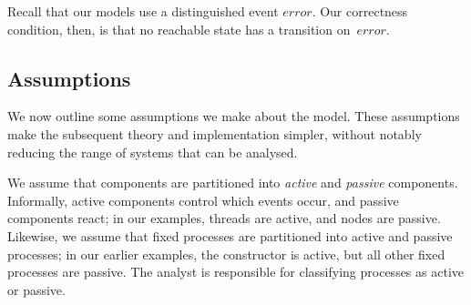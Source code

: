 Recall that our models use a distinguished event $error$.  Our correctness
condition, then, is that no reachable state has a transition on~$error$.






\subsection{Assumptions}

We now outline some assumptions we make about the model.  These assumptions
make the subsequent theory and implementation simpler, without notably
reducing the range of systems that can be analysed.  

We assume that components are partitioned into \emph{active} and
\emph{passive} components.  Informally, active components control which events
occur, and passive components react; in our examples, threads are active, and
nodes are passive.  Likewise, we assume that fixed processes are partitioned
into active and passive processes; in our earlier examples, the constructor is
active, but all other fixed processes are passive.  The analyst is responsible
for classifying processes as active or passive. 

